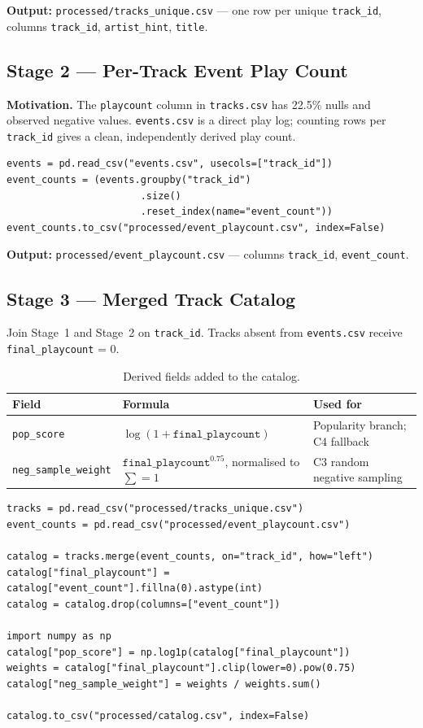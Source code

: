 \documentclass[11pt]{article}
\begin{document}
\textbf{Output:} \texttt{processed/tracks\_unique.csv} ---
one row per unique \texttt{track\_id}, columns
\texttt{track\_id}, \texttt{artist\_hint}, \texttt{title}.

\subsection{Stage 2 --- Per-Track Event Play Count}

\textbf{Motivation.}
The \texttt{playcount} column in \texttt{tracks.csv} has 22.5\% nulls and
observed negative values. \texttt{events.csv} is a direct play log; counting
rows per \texttt{track\_id} gives a clean, independently derived play count.

\begin{lstlisting}
events = pd.read_csv("events.csv", usecols=["track_id"])
event_counts = (events.groupby("track_id")
                       .size()
                       .reset_index(name="event_count"))
event_counts.to_csv("processed/event_playcount.csv", index=False)
\end{lstlisting}

\textbf{Output:} \texttt{processed/event\_playcount.csv} ---
columns \texttt{track\_id}, \texttt{event\_count}.

\subsection{Stage 3 --- Merged Track Catalog}

Join Stage~1 and Stage~2 on \texttt{track\_id}. Tracks absent from
\texttt{events.csv} receive \texttt{final\_playcount} = 0.

\begin{table}[H]
\centering
\caption{Derived fields added to the catalog.}
\begin{tabular}{lll}
\toprule
\textbf{Field} & \textbf{Formula} & \textbf{Used for} \\
\midrule
\texttt{pop\_score}          & $\log(1 + \texttt{final\_playcount})$ &
  Popularity branch; C4 fallback \\
\texttt{neg\_sample\_weight} & $\texttt{final\_playcount}^{0.75}$, normalised to $\sum = 1$ &
  C3 random negative sampling \\
\bottomrule
\end{tabular}
\end{table}

\begin{lstlisting}
tracks = pd.read_csv("processed/tracks_unique.csv")
event_counts = pd.read_csv("processed/event_playcount.csv")

catalog = tracks.merge(event_counts, on="track_id", how="left")
catalog["final_playcount"] = catalog["event_count"].fillna(0).astype(int)
catalog = catalog.drop(columns=["event_count"])

import numpy as np
catalog["pop_score"] = np.log1p(catalog["final_playcount"])
weights = catalog["final_playcount"].clip(lower=0).pow(0.75)
catalog["neg_sample_weight"] = weights / weights.sum()

catalog.to_csv("processed/catalog.csv", index=False)
\end{lstlisting}
\end{document}
